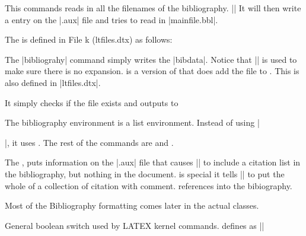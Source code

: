  This commands reads in all the filenames of the bibliography. ||
It will then write a  entry on the |.aux| file and tries to read in |mainfile.bbl|.



The  is defined in File k (ltfiles.dtx) as follows:
\begin{teX}
\newif\if@filesw \@fileswtrue
\end{teX}

The |bibliograhy| command simply writes the |bibdata|. Notice that |\string| is used to make sure  there is no expansion.  is a version of  that does add the file to . This is also defined in |ltfiles.dtx|. 

\begin{teX}
\def\@input@#1{\InputIfFileExists{#1}{}{\typeout{No file #1.}}}
\end{teX}


\noindent It simply checks if the file exists and outputs to 






The bibliography environment is a list environment. Instead of using |\item|, it uses . The rest of the commands are  and .

The , puts information on the |.aux| file that causes |\bibtex| to include a citation list in the bibliography, but nothing in the document. is special it tells |\bibtex| to put the whole of a collection of citation with comment.
references into the bibiography.

Most of the Bibliography formatting comes later in the actual classes.


 General boolean switch used by LATEX kernel commands.
defines as |\newif\if@tempswa|

